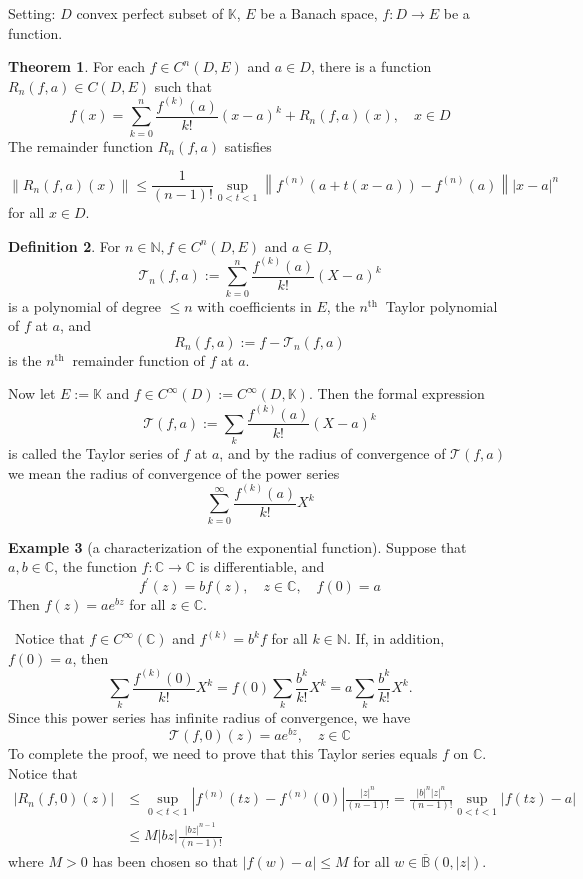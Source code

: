 \documentclass[12pt,a4paper]{book}
\newenvironment{prooff}{{\noindent\it\textcolor{cyan!40!black}{Proof}:}\,}{\par}
\newcommand{\bb}[1]{\mathbb{#1}}
\theoremstyle{definition}
\newtheorem{defn}{Definition}[section]
\newtheorem{theo}[defn]{Theorem}
\newtheorem{exam}[defn]{Example}
\begin{document}
Setting: $D$ convex perfect subset of $\bb{K}$, $E$ be a Banach space, $f:D\rightarrow E$ be a function.
\begin{theo}
    For each $f \in C^n(D, E)$ and $a \in D$, there is a function $R_n(f, a) \in C(D, E)$ such that
    $$
    f(x)=\sum_{k=0}^n \frac{f^{(k)}(a)}{k!}(x-a)^k+R_n(f, a)(x), \quad x \in D
    $$  
    The remainder function $R_n(f, a)$ satisfies
    
    $$
    \left\|R_n(f, a)(x)\right\| \leq \frac{1}{(n-1)!} \sup _{0<t<1}\left\|f^{(n)}(a+t(x-a))-f^{(n)}(a)\right\||x-a|^n
    $$
    for all $x \in D$.
\end{theo}
\begin{defn}
    For $n \in \mathbb{N}, f \in C^n(D, E)$ and $a \in D$,
    $$
    \mathcal{T}_n(f, a):=\sum_{k=0}^n \frac{f^{(k)}(a)}{k!}(X-a)^k
    $$
    is a polynomial of degree $\leq n$ with coefficients in $E$, the $n^{\text {th }}$ Taylor polynomial of $f$ at $a$, and
    $$
    R_n(f, a):=f-\mathcal{T}_n(f, a)
    $$
    is the $n^{\text {th }}$ remainder function of $f$ at $a$. 
    
    Now let $E:=\mathbb{K}$ and $f \in C^{\infty}(D):=C^{\infty}(D, \mathbb{K})$. Then the formal expression
    $$
    \mathcal{T}(f, a):=\sum_k \frac{f^{(k)}(a)}{k!}(X-a)^k
    $$
    is called the Taylor series of $f$ at $a$, and by the radius of convergence of $\mathcal{T}(f, a)$ we mean the radius of convergence of the power series
    $$
    \sum_{k=0}^{\infty} \frac{f^{(k)}(a)}{k!} X^k
    $$
\end{defn}
\begin{exam}[a characterization of the exponential function]
    Suppose that $a, b \in \mathbb{C}$, the function $f: \mathbb{C} \rightarrow \mathbb{C}$ is differentiable, and
$$
f^{\prime}(z)=b f(z), \quad z \in \mathbb{C}, \quad f(0)=a
$$
Then $f(z)=a e^{b z}$ for all $z \in \mathbb{C}$.
\end{exam}
\begin{prooff}
    Notice that $f \in C^{\infty}(\mathbb{C})$ and $f^{(k)}=b^k f$ for all $k \in \mathbb{N}$. If, in addition, $f(0)=a$, then
    $$
    \sum_k \frac{f^{(k)}(0)}{k!} X^k=f(0) \sum_k \frac{b^k}{k!} X^k=a \sum_k \frac{b^k}{k!} X^k .
    $$
    Since this power series has infinite radius of convergence, we have
    $$
    \mathcal{T}(f, 0)(z)=a e^{b z}, \quad z \in \mathbb{C}
    $$
    To complete the proof, we need to prove that this Taylor series equals $f$ on $\mathbb{C}$. Notice that 
    $$
    \begin{aligned}
    \left|R_n(f, 0)(z)\right| & \leq \sup _{0<t<1}\left|f^{(n)}(t z)-f^{(n)}(0)\right| \frac{|z|^n}{(n-1)!}=\frac{|b|^n|z|^n}{(n-1)!} \sup _{0<t<1}|f(t z)-a| \\
    & \leq M|b z| \frac{|b z|^{n-1}}{(n-1)!}
    \end{aligned}
    $$
    where $M>0$ has been chosen so that $|f(w)-a| \leq M$ for all $w \in \overline{\mathbb{B}}(0,|z|)$. 
\end{prooff}
\end{document}
